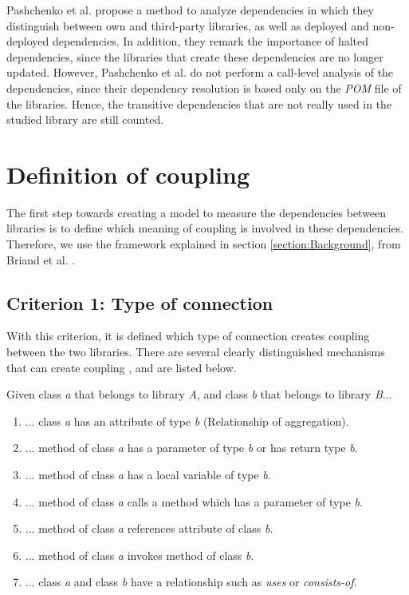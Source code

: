 \documentclass[a4paper]{article}
\begin{document}
Pashchenko et al. \cite{pashchenko2018vulnerable} propose a method to analyze dependencies in which they distinguish between own and third-party libraries, as well as deployed and non-deployed dependencies. In addition, they remark the importance of halted dependencies, since the libraries that create these dependencies are no longer updated. However, Pashchenko et al. do not perform a call-level analysis of the dependencies, since their dependency resolution is based only on the \textit{POM} file of the libraries. Hence, the transitive dependencies that are not really used in the studied library are still counted.

\section{Definition of coupling}\label{section:defCoupling}
The first step towards creating a model to measure the dependencies between libraries is to define which meaning of coupling is involved in these dependencies. Therefore, we use the framework explained in section \ref{section:Background}, from Briand et al. \cite{briand1999unified}.

\subsection{Criterion 1: Type of connection}
With this criterion, it is defined which type of connection creates coupling between the two libraries. There are several clearly distinguished mechanisms that can create coupling \cite{briand1999unified}, and are listed below.

Given class \textit{a} that belongs to library \textit{A}, and class \textit{b} that belongs to library \textit{B}...

\begin{enumerate}[noitemsep,leftmargin=*]
  \item ... class \textit{a} has an attribute of type \textit{b} (Relationship of aggregation).
  \item ... method of class \textit{a} has a parameter of type \textit{b} or has return type \textit{b}.
  \item ... method of class \textit{a} has a local variable of type \textit{b}.
  \item ... method of class \textit{a} calls a method which has a parameter of type \textit{b}.
  \item ... method of class \textit{a} references attribute of class \textit{b}.
  \item ... method of class \textit{a} invokes method of class \textit{b}.
  \item ... class \textit{a} and class \textit{b} have a relationship such as \textit{uses} or \textit{consists-of}.
\end{enumerate}
\end{document}
